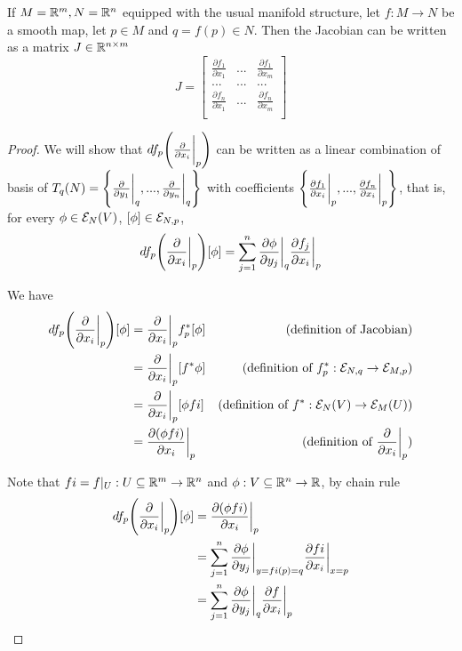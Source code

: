 \begin{proposition}
	If $M = \R^m, N = \R^n$ equipped with the usual manifold structure, let $f: M \to N$ be a smooth map, let $p \in M$ and $q = f(p) \in N$. Then the Jacobian can be written as a matrix $J \in \R^{n \times m}$
	$$
	J = \begin{bmatrix}
		\frac{\partial f_1}{\partial x_1} & ... & \frac{\partial f_1}{\partial x_m} \\
		... & ... & ... \\
		\frac{\partial f_n}{\partial x_1} & ... & \frac{\partial f_n}{\partial x_m} \\
	\end{bmatrix}
	$$
	\begin{proof}
		We will show that $df_p \tuple*{\frac{\partial}{\partial x_i}\bigg\vert_p}$ can be written as a linear combination of basis of $T_q(N) = \set*{\frac{\partial}{\partial y_1}\bigg\vert_{q}, ..., \frac{\partial}{ \partial y_n}\bigg\vert_{q}}$ with coefficients $\set*{\frac{\partial f_1}{\partial x_i}\bigg\vert_p, ..., \frac{\partial f_n}{\partial x_i}\bigg\vert_p}$, that is, for every $\phi \in \E_N(V)$, $[\phi] \in \E_{N, p}$,
		$$
		df_p \tuple*{\frac{\partial}{\partial x_i}\bigg\vert_p} [\phi] = \sum_{j=1}^n \frac{\partial \phi}{\partial y_j} \bigg\vert_{q} \frac{\partial f_j}{\partial x_i} \bigg\vert_{p}
		$$
		
		We have
		\begin{align*}
			df_p \tuple*{\frac{\partial}{\partial x_i}\bigg\vert_p} [\phi]
			&= \frac{\partial}{\partial x_i}\bigg\vert_p f^*_p [\phi]  &\text{(definition of Jacobian)} \\
			&= \frac{\partial}{\partial x_i}\bigg\vert_p [f^* \phi] &\text{(definition of $f^*_p: \E_{N, q} \to \E_{M, p}$)} \\
			&= \frac{\partial}{\partial x_i}\bigg\vert_p [\phi f i] &\text{(definition of $f^*: \E_N(V) \to \E_M(U)$)} \\
			&= \frac{\partial(\phi f i)}{\partial x_i}\bigg\vert_p &\text{(definition of $\frac{\partial}{\partial x_i}\bigg\vert_p$)}
		\end{align*}
		
		Note that $fi = f|_U: U \subseteq \R^m \to \R^n$ and $\phi: V \subseteq \R^n \to \R$, by chain rule
		\begin{align*}
			df_p \tuple*{\frac{\partial}{\partial x_i}\bigg\vert_p} [\phi]
			&= \frac{\partial(\phi f i)}{\partial x_i}\bigg\vert_p \\
			&= \sum_{j=1}^n \frac{\partial \phi}{\partial y_j} \bigg\vert_{y = fi(p) = q} \frac{\partial fi}{\partial x_i} \bigg\vert_{x = p} \\
			&= \sum_{j=1}^n \frac{\partial \phi}{\partial y_j} \bigg\vert_{q} \frac{\partial f}{\partial x_i} \bigg\vert_{p}
		\end{align*}
		
	\end{proof}
\end{proposition}

